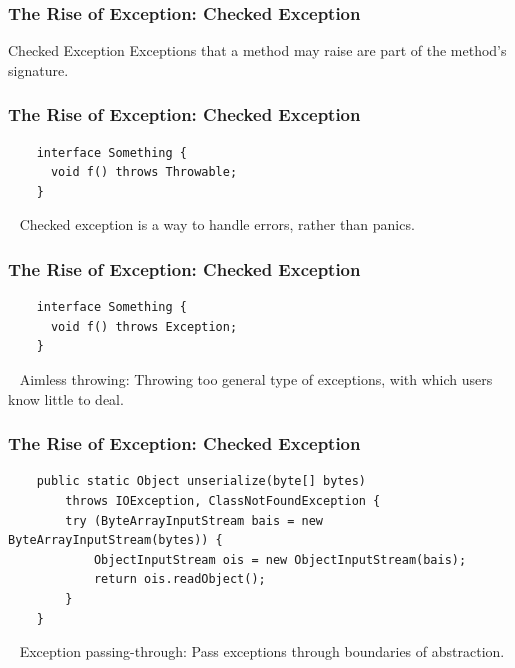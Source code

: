 \documentclass[lualatex]{beamer}
\begin{document}
\begin{frame}
  \frametitle{The Rise of Exception: Checked Exception}

  \begin{block}{Checked Exception}
    Exceptions that a method may raise are part of the method's signature.
  \end{block}
\end{frame}

\begin{frame}[fragile]
  \frametitle{The Rise of Exception: Checked Exception}

  \begin{verbatim}
    interface Something {
      void f() throws Throwable;
    }
  \end{verbatim}

  \begin{alertblock}{~}
    Checked exception is a way to handle errors, rather than panics.
  \end{alertblock}
\end{frame}

\begin{frame}[fragile]
  \frametitle{The Rise of Exception: Checked Exception}

  \begin{verbatim}
    interface Something {
      void f() throws Exception;
    }
  \end{verbatim}

  \begin{alertblock}{~}
    Aimless throwing: Throwing too general type of exceptions, with which users know little to deal.
  \end{alertblock}
\end{frame}

\begin{frame}[fragile]
  \frametitle{The Rise of Exception: Checked Exception}

  \begin{verbatim}
    public static Object unserialize(byte[] bytes)
        throws IOException, ClassNotFoundException {
        try (ByteArrayInputStream bais = new ByteArrayInputStream(bytes)) {
            ObjectInputStream ois = new ObjectInputStream(bais);
            return ois.readObject();
        }
    }
  \end{verbatim}

  \begin{alertblock}{~}
    Exception passing-through: Pass exceptions through boundaries of abstraction.
  \end{alertblock}
\end{frame}
\end{document}
